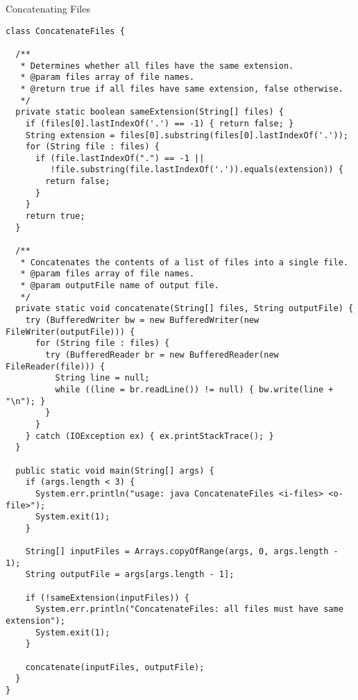 \begin{cl}[]{Concatenating Files}
\begin{lstlisting}[language=MyJava]
class ConcatenateFiles {
 
  /**
   * Determines whether all files have the same extension.
   * @param files array of file names.
   * @return true if all files have same extension, false otherwise.
   */
  private static boolean sameExtension(String[] files) {
    if (files[0].lastIndexOf('.') == -1) { return false; }
    String extension = files[0].substring(files[0].lastIndexOf('.'));
    for (String file : files) {
      if (file.lastIndexOf(".") == -1 || 
         !file.substring(file.lastIndexOf('.')).equals(extension)) { 
        return false; 
      }
    }
    return true;
  }

  /**
   * Concatenates the contents of a list of files into a single file.
   * @param files array of file names.
   * @param outputFile name of output file.
   */
  private static void concatenate(String[] files, String outputFile) {
    try (BufferedWriter bw = new BufferedWriter(new FileWriter(outputFile))) {
      for (String file : files) {
        try (BufferedReader br = new BufferedReader(new FileReader(file))) {
          String line = null;
          while ((line = br.readLine()) != null) { bw.write(line + "\n"); }
        }
      }
    } catch (IOException ex) { ex.printStackTrace(); }
  }

  public static void main(String[] args) {
    if (args.length < 3) {
      System.err.println("usage: java ConcatenateFiles <i-files> <o-file>");
      System.exit(1);
    }

    String[] inputFiles = Arrays.copyOfRange(args, 0, args.length - 1);
    String outputFile = args[args.length - 1];

    if (!sameExtension(inputFiles)) {
      System.err.println("ConcatenateFiles: all files must have same extension");
      System.exit(1);
    }

    concatenate(inputFiles, outputFile);
  }
}
\end{lstlisting}
\end{cl}


